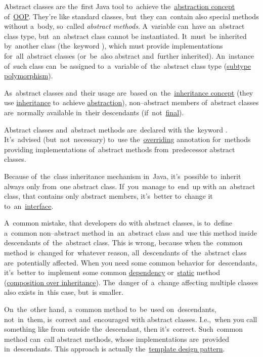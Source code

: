 \label{javaabstractclasses}
Abstract classes are the~first Java tool to~achieve the~\hyperref[abstraction]{abstraction concept} of~\hyperref[objectorientedprogramming]{OOP}.
They're like standard classes, but~they can~contain also special methods without a~body, so~called \textit{abstract methods}.
A~variable can~have an~abstract class type, but~an~abstract class cannot be instantiated.
It~must~be inherited by~another class (the~keyword ), which must provide implementations for~all~abstract classes (or~be~also abstract and~further inherited).
An~instance of~such class can~be assigned to~a~variable of~the~abstract class type (\hyperref[polymorphism]{subtype polymorphism}).

As~abstract classes and~their usage are~based on~the~\hyperref[inheritance]{inheritance concept} (they use \hyperref[inheritance]{inheritance} to~achieve \hyperref[abstraction]{abstraction}), \mbox{non--abstract} members of~abstract classes are~normally available in~their descendants (if~not~\hyperref[javafinal]{final}).

Abstract classes and~abstract methods are~declared with the~keyword .
It's~advised (but~not~necessary) to~use the~\hyperref[javaoverride]{overriding} annotation for~methods providing implementations of~abstract methods from~predecessor abstract classes.

Because of~the~class inheritance mechanism in~Java, it's~possible to~inherit always only from~one abstract class.
If~you~manage to~end~up with an~abstract class, that contains only abstract members, it's~better to~change it to~an~\hyperref[javainterfaces]{interface}.

A~common mistake, that developers do with abstract classes, is to~define a~common \mbox{non--abstract} method in~an~abstract class and~use this method inside descendants of~the~abstract class.
This is wrong, because when the~common method is~changed for~whatever reason, all~descendants of~the~abstract class are~potentially affected.
When you need some common behavior for~descendants, it's~better to~implement some common \hyperref[dependencyinjection]{dependency} or~\hyperref[javastatic]{static} method (\hyperref[compositionoverinheritance]{composition over inheritance}).
The~danger of~a~change affecting multiple classes also exists in~this case, but~is smaller.

On~the~other hand, a~common method to~be~used on~descendants, not~in~them, is~correct and~encouraged with abstract classes.
I.e.,~when you call something like  from outside the~descendant, then it's~correct.
Such~common method can~call abstract methods, whose implementations are~provided in~descendants.
This approach is actually the~\hyperref[templatedp]{template design pattern}.

